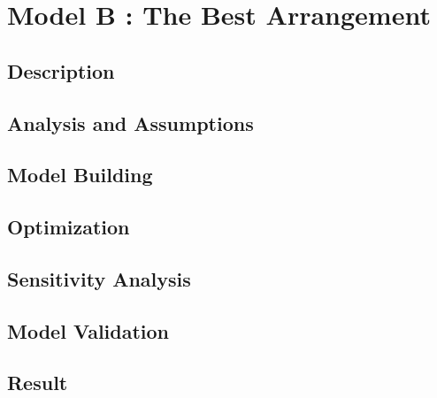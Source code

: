 \documentclass{mcmthesis}
\begin{document}
\section{Model B : The Best Arrangement}
\subsection{Description}
\subsection{Analysis and Assumptions}
\subsection{Model Building}
\subsection{Optimization}
\subsection{Sensitivity Analysis}
\subsection{Model Validation}
\subsection{Result}






\end{document}
